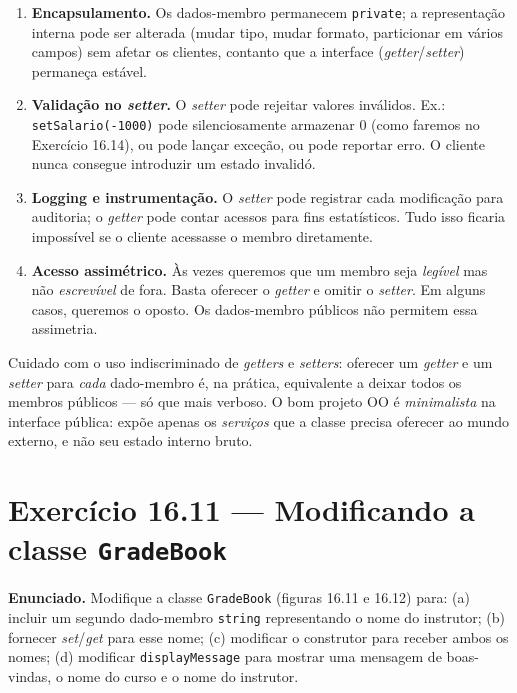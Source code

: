 \documentclass[11pt,a4paper]{article}
\begin{document}
\begin{enumerate}[leftmargin=*]
  \item \textbf{Encapsulamento.} Os dados-membro permanecem \texttt{private}; a representa\c{c}\~ao interna pode ser alterada (mudar tipo, mudar formato, particionar em v\'arios campos) sem afetar os clientes, contanto que a interface (\emph{getter}/\emph{setter}) permane\c{c}a est\'avel.
  \item \textbf{Valida\c{c}\~ao no \emph{setter}.} O \emph{setter} pode rejeitar valores inv\'alidos. Ex.: \texttt{setSalario(-1000)} pode silenciosamente armazenar 0 (como faremos no Exerc\'icio 16.14), ou pode lan\c{c}ar exce\c{c}\~ao, ou pode reportar erro. O cliente nunca consegue introduzir um estado invalid\'o.
  \item \textbf{Logging e instrumenta\c{c}\~ao.} O \emph{setter} pode registrar cada modifica\c{c}\~ao para auditoria; o \emph{getter} pode contar acessos para fins estat\'isticos. Tudo isso ficaria imposs\'ivel se o cliente acessasse o membro diretamente.
  \item \textbf{Acesso assim\'etrico.} \`As vezes queremos que um membro seja \emph{leg\'ivel} mas n\~ao \emph{escrev\'ivel} de fora. Basta oferecer o \emph{getter} e omitir o \emph{setter}. Em alguns casos, queremos o oposto. Os dados-membro p\'ublicos n\~ao permitem essa assimetria.
\end{enumerate}

\begin{obseng}
Cuidado com o uso indiscriminado de \emph{getters} e \emph{setters}: oferecer um \emph{getter} e um \emph{setter} para \emph{cada} dado-membro \'e, na pr\'atica, equivalente a deixar todos os membros p\'ublicos --- s\'o que mais verboso. O bom projeto OO \'e \emph{minimalista} na interface p\'ublica: exp\~oe apenas os \emph{servi\c{c}os} que a classe precisa oferecer ao mundo externo, e n\~ao seu estado interno bruto.
\end{obseng}

\newpage
\section{Exerc\'icio 16.11 --- Modificando a classe \texttt{GradeBook}}

\begin{enunciado}
\textbf{Enunciado.} Modifique a classe \texttt{GradeBook} (figuras 16.11 e 16.12) para: (a) incluir um segundo dado-membro \texttt{string} representando o nome do instrutor; (b) fornecer \emph{set}/\emph{get} para esse nome; (c) modificar o construtor para receber ambos os nomes; (d) modificar \texttt{displayMessage} para mostrar uma mensagem de boas-vindas, o nome do curso e o nome do instrutor.
\end{enunciado}
\end{document}
